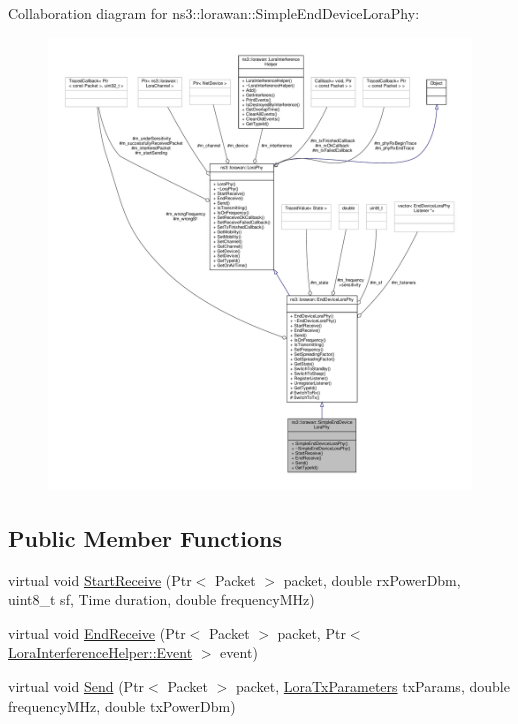 Collaboration diagram for ns3\+:\+:lorawan\+:\+:Simple\+End\+Device\+Lora\+Phy\+:
\nopagebreak
\begin{figure}[H]
\begin{center}
\leavevmode
\includegraphics[width=350pt]{classns3_1_1lorawan_1_1SimpleEndDeviceLoraPhy__coll__graph}
\end{center}
\end{figure}
\subsection*{Public Member Functions}
\begin{DoxyCompactItemize}
\item 
virtual void \hyperlink{classns3_1_1lorawan_1_1SimpleEndDeviceLoraPhy_ad7a421670937fa0c4ece217ae02598ad}{Start\+Receive} (Ptr$<$ Packet $>$ packet, double rx\+Power\+Dbm, uint8\+\_\+t sf, Time duration, double frequency\+M\+Hz)
\item 
virtual void \hyperlink{classns3_1_1lorawan_1_1SimpleEndDeviceLoraPhy_a03a9d0ffdd5f89991a61aa54e5a1e7ba}{End\+Receive} (Ptr$<$ Packet $>$ packet, Ptr$<$ \hyperlink{classns3_1_1lorawan_1_1LoraInterferenceHelper_1_1Event}{Lora\+Interference\+Helper\+::\+Event} $>$ event)
\item 
virtual void \hyperlink{classns3_1_1lorawan_1_1SimpleEndDeviceLoraPhy_a5698d15e92de30b7f9178af3997b89e9}{Send} (Ptr$<$ Packet $>$ packet, \hyperlink{structns3_1_1lorawan_1_1LoraTxParameters}{Lora\+Tx\+Parameters} tx\+Params, double frequency\+M\+Hz, double tx\+Power\+Dbm)
\end{DoxyCompactItemize}
